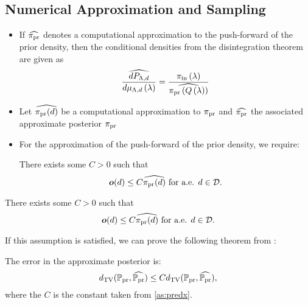 \subsection{Numerical Approximation and Sampling}
\begin{frame}[t]
\begin{itemize}
	\item <1-> If $\widehat{\operatorname*{\pi_{pr}}}$ denotes a computational approximation to the push-forward of the prior density, then the conditional densities from the disintegration theorem are given as
\[
\frac{\widehat{dP_{{\Lambda}, d}}}{d\mu_{{\Lambda}, d}\left ( \lambda \right )} = \frac{\operatorname*{\pi_{in}}\left ( \lambda \right )}{ \widehat{\operatorname*{\pi_{pr}}\left ( Q\left ( \lambda \right ) \right )} }
\]
	\item <2-> Let $\widehat{\operatorname*{\pi_{pr}}(d)}$ be a computational approximation to $\operatorname*{\pi_{pr}}$ and $\widehat{\operatorname*{\pi_{pr}}}$ the associated approximate posterior $\operatorname*{\pi_{pr}}$
	\item <3-> For the approximation of the push-forward of the prior density, we require:
\begin{assumption}\label{as:predx}
There exists some $C>0$ such that
\[
\operatorname*{\boldsymbol{o}} (d) \leq C \widehat{\operatorname*{\pi_{pr}}(d)} \text{ for a.e. } d\in \mathcal{D}.
\]
\end{assumption}

\end{itemize}

\end{frame}


\begin{frame}[t]
\begin{assumption}\label{as:predx}
There exists some $C>0$ such that
\[
\operatorname*{\boldsymbol{o}} (d) \leq C \widehat{\operatorname*{\pi_{pr}}(d)} \text{ for a.e. } d\in \mathcal{D}.
\]
\end{assumption}

If this assumption is satisfied, we can prove the following theorem from \cite{BJW18}:

\begin{theorem}
The error in the approximate posterior is:
\begin{equation}\label{eq:pfpr_bound}
d_{\text{TV}} (\operatorname*{\mathbb{P}_{pr}}, \widehat{\operatorname*{\mathbb{P}_{pr}}}) \leq C d_{\text{TV}} (\operatorname*{\mathbb{P}_{pr}}, \widehat{\operatorname*{\mathbb{P}_{pr}}}),
\end{equation}
where the $C$ is the constant taken from \eqref{as:predx}. 
\end{theorem}

\end{frame}


